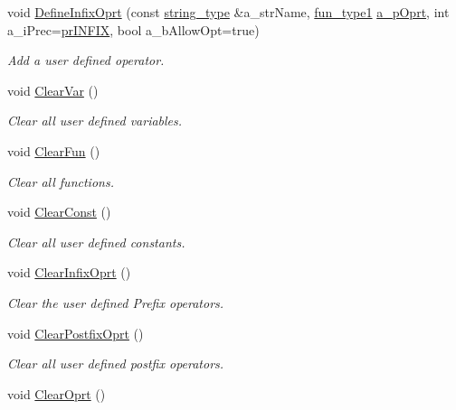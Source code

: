 \begin{DoxyCompactItemize}
void \hyperlink{classmu_1_1_parser_base_a5e26f06efc7564a85a5f5ab682ba5a23}{Define\+Infix\+Oprt} (const \hyperlink{namespacemu_ae9f8b44d9a97dd397180891e8390c3e9}{string\+\_\+type} \&a\+\_\+str\+Name, \hyperlink{namespacemu_affeaec09801b502b9955d7248b7e2706}{fun\+\_\+type1} \hyperlink{mu_parser_d_l_l_8h_ae106b6975be89f5cf1d116ebca53cccc}{a\+\_\+p\+Oprt}, int a\+\_\+i\+Prec=\hyperlink{namespacemu_af05119698ed9c62239c0b31ac9861d3da50b576d79c0d155f703d409967ad3727}{pr\+I\+N\+F\+IX}, bool a\+\_\+b\+Allow\+Opt=true)
\begin{DoxyCompactList}\small\item\em Add a user defined operator. \end{DoxyCompactList}\item 
void \hyperlink{classmu_1_1_parser_base_add23e405d36de71de6b386bc0eb4b57c}{Clear\+Var} ()
\begin{DoxyCompactList}\small\item\em Clear all user defined variables. \end{DoxyCompactList}\item 
void \hyperlink{classmu_1_1_parser_base_abc296c44f8a9522b2cf12a9ad36071b2}{Clear\+Fun} ()
\begin{DoxyCompactList}\small\item\em Clear all functions. \end{DoxyCompactList}\item 
void \hyperlink{classmu_1_1_parser_base_adbc445632a056820ff722ca18c1331e9}{Clear\+Const} ()
\begin{DoxyCompactList}\small\item\em Clear all user defined constants. \end{DoxyCompactList}\item 
void \hyperlink{classmu_1_1_parser_base_a7485eccf3281c879dad059966e3cbe22}{Clear\+Infix\+Oprt} ()
\begin{DoxyCompactList}\small\item\em Clear the user defined Prefix operators. \end{DoxyCompactList}\item 
void \hyperlink{classmu_1_1_parser_base_ab8a8356532f0047d8a33a46bc77f4bc5}{Clear\+Postfix\+Oprt} ()
\begin{DoxyCompactList}\small\item\em Clear all user defined postfix operators. \end{DoxyCompactList}\item 
void \hyperlink{classmu_1_1_parser_base_aa5fd05a7bb2b8bc9f9745c5377c0ebf3}{Clear\+Oprt} ()

\end{DoxyCompactItemize}
